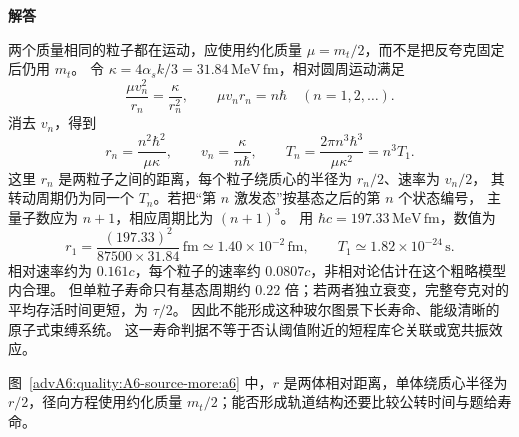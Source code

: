 \begin{advsolution}
\begin{center}\begin{minipage}{.96\linewidth}\centering
\raggedright{\bfseries\color{DeepBlue}解答}\par\smallskip\centering

\label{advA6:quality:A6-source-more:a6}
\end{minipage}\end{center}

两个质量相同的粒子都在运动，应使用约化质量 $\mu=m_t/2$，而不是把反夸克固定后仍用 $m_t$。
令 $\kappa=4\alpha_s k/3=31.84\,\mathrm{MeV\,fm}$，相对圆周运动满足
\[
 \frac{\mu v_n^2}{r_n}=\frac\kappa{r_n^2},\qquad
 \mu v_nr_n=n\hbar\quad(n=1,2,\ldots).
\]
消去 $v_n$，得到
\[
 r_n=\frac{n^2\hbar^2}{\mu\kappa},\qquad
 v_n=\frac{\kappa}{n\hbar},\qquad
 T_n=\frac{2\pi n^3\hbar^3}{\mu\kappa^2}=n^3T_1.
\]
这里 $r_n$ 是两粒子之间的距离，每个粒子绕质心的半径为 $r_n/2$、速率为 $v_n/2$，
其转动周期仍为同一个 $T_n$。若把“第 $n$ 激发态”按基态之后的第 $n$ 个状态编号，
主量子数应为 $n+1$，相应周期比为 $(n+1)^3$。
用 $\hbar c=197.33\,\mathrm{MeV\,fm}$，数值为
\[
 \boxed{r_1=\frac{(197.33)^2}{87500\times31.84}\,\mathrm{fm}
 \simeq1.40\times10^{-2}\,\mathrm{fm}},\qquad
 \boxed{T_1\simeq1.82\times10^{-24}\,\mathrm s}.
\]
相对速率约为 $0.161c$，每个粒子的速率约 $0.0807c$，非相对论估计在这个粗略模型内合理。
但单粒子寿命只有基态周期约 $0.22$ 倍；若两者独立衰变，完整夸克对的平均存活时间更短，为 $\tau/2$。
因此不能形成这种玻尔图景下长寿命、能级清晰的原子式束缚系统。
这一寿命判据不等于否认阈值附近的短程库仑关联或宽共振效应。

图~\ref{advA6:quality:A6-source-more:a6} 中，$r$ 是两体相对距离，单体绕质心半径为 $r/2$，径向方程使用约化质量 $m_t/2$；能否形成轨道结构还要比较公转时间与题给寿命。
\end{advsolution}

